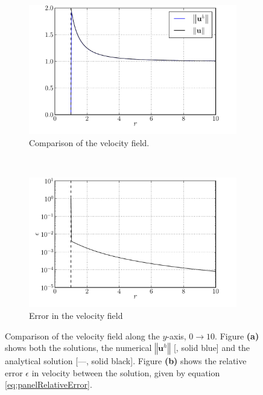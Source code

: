 	\begin{figure}[!t]
     \centering
     \begin{subfigure}[b]{0.5\textwidth}
             \includegraphics[width=\textwidth]{figures/lagrangian/panelCylinder_versusAnalytical.pdf}
             \caption{Comparison of the velocity field.}
             \label{fig:panelCylinder_versusAnalytical}
     \end{subfigure}%
     ~ %
     \begin{subfigure}[b]{0.5\textwidth}
             \includegraphics[width=\textwidth]{figures/lagrangian/panelCylinder_error.pdf}
             \caption{Error in the velocity field}
             \label{fig:panelCylinder_error}
     \end{subfigure}
     \caption{Comparison of the velocity field along the $y$-axis, $0\rightarrow10$. Figure \textbf{(a)} shows both the solutions, the numerical $\left\Vert\mathbf{u}^h\right\Vert$ [{\color{plotBlue}{---}}, solid blue] and the analytical solution [---, solid black]. Figure \textbf{(b)} shows the relative error $\epsilon$ in velocity between the solution, given by equation \ref{eq:panelRelativeError}.}
     \label{fig:panelCylinderComparision}
	\end{figure}

